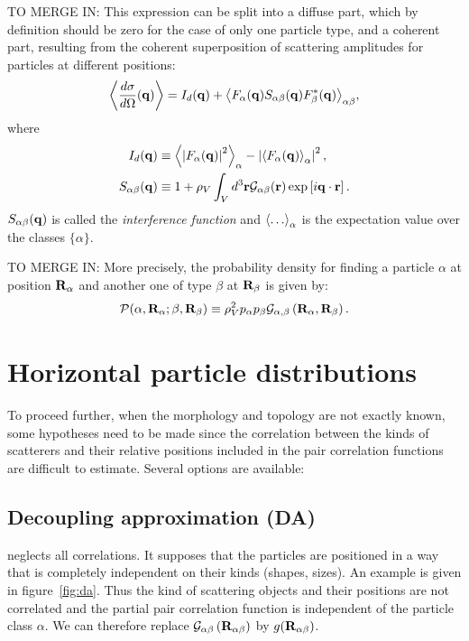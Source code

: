 TO MERGE IN:
This expression can be split into a diffuse part, which by definition should be zero for the case of only one particle type, and a coherent part, resulting from the coherent superposition of scattering amplitudes for particles at different positions:
\begin{equation*}
  \left\langle \frac{d\sigma}{d\Omega}(\mathbf{q}) \right\rangle
  = I_d(\mathbf{q}) + {\left\langle F_\alpha (\mathbf{q} ) S_{\alpha\beta} (\mathbf{q}) F_\beta^* (\mathbf{q})
               \right\rangle}_{\alpha\beta},
\end{equation*}
where
\begin{align*}
  I_d(\mathbf{q}) &
  \equiv {\ensuremath{\left\langle}\left\rvert F_\alpha (\ensuremath{\mathbf{q}}) \right\rvert^2\ensuremath{\right\rangle}}_{\alpha}
       - \left\lvert {\ensuremath{\left\langle}F_\alpha (\ensuremath{\mathbf{q}})\ensuremath{\right\rangle}}_{\alpha} \right\rvert^2, \\
  S_{\alpha\beta} (\mathbf{q}) &\equiv 1 + \rho_V \int_V d^3\mathbf{r}\mathcal{G}_{\alpha\beta}(\mathbf{r}) \exp \left[ i\mathbf{q}\cdot \mathbf{r} \right].
\end{align*}
$S_{\alpha\beta} (\mathbf{q})$ is called the \emph{interference function} and $\bra\dotso\ket_\alpha$ is the expectation value over the classes $\lbrace \alpha\rbrace$.


TO MERGE IN:
More precisely, the probability density for finding a particle $\alpha$ at position $\mathbf{R}_\alpha$ and another one of type $\beta$ at $\mathbf{R}_\beta$ is given by:
\begin{equation*}
  \mathcal{P}(\alpha, \mathbf{R}_\alpha ; \beta , \mathbf{R}_\beta ) \equiv \rho_V^2 p_\alpha p_\beta \mathcal{G}_{\alpha ,\beta}\left( \mathbf{R}_{\alpha} , \mathbf{R}_{\beta} \right).
\end{equation*}


\section{Horizontal particle distributions}

To proceed further, when the morphology and topology are not exactly known, some hypotheses need to be made since the correlation between the kinds of scatterers and their relative positions included in the pair correlation functions are difficult to estimate. Several options are available:

\subsection{Decoupling approximation (DA)}
neglects all correlations. It supposes that the particles are positioned in a way that is completely independent on their kinds (shapes, sizes). An example is given in figure~\ref{fig:da}. Thus the kind of scattering objects and their positions are not correlated and the partial pair correlation function is independent of the particle class $\alpha$. We can therefore replace $ \mathcal{G}_{\alpha \beta}\left( \mathbf{R}_{\alpha \beta} \right)$ by  $g(\mathbf{R}_{\alpha\beta})$.

